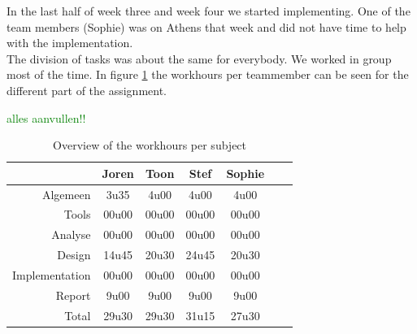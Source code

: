 \documentclass[i2]{oss}
\newcommand{\comment}[1]{{\huge \textcolor{green}{#1}}\\}
\begin{document}
In the last half of week three and week four we started  implementing. One of the team members (Sophie) was on Athens that week and did not have time to help with the implementation. \\

The division of tasks was about the same for everybody. We worked in group most of the time. In figure \ref{tab:werkuren} the workhours per teammember can be seen for the different part of the assignment.

\comment{alles aanvullen!!}
\begin{table}[h!]
\begin{center}
    \begin{tabular}{ r | c  c  c  c  c  c}
     & Joren & Toon & Stef & Sophie \\ \hline
    Algemeen & 3u35 & 4u00 & 4u00 & 4u00\\
           Tools & 00u00 & 00u00 & 00u00 & 00u00 \\
        Analyse & 00u00 & 00u00 & 00u00 & 00u00 \\
        Design & 14u45 & 20u30 & 24u45 & 20u30 \\
        Implementation & 00u00 & 00u00 & 00u00 & 00u00\\
        Report & 9u00 & 9u00 & 9u00 & 9u00 \\
        Total & 29u30 & 29u30 & 31u15 & 27u30  
    \end{tabular}
    \caption{Overview of the workhours per subject}
    \label{tab:werkuren}
\end{center}
\end{table}
\end{document}
